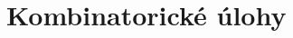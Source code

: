 \documentclass[a4paper,oneside,12pt]{book}
\theoremstyle{definition}
\theoremstyle{plain}
\theoremstyle{remark}
\begin{document}
\part{Kombinatorické úlohy}


\clearpage


\clearpage


\clearpage


\clearpage




\end{document}
